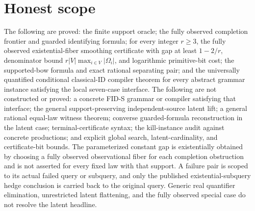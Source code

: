 \documentclass{article}
\begin{document}
\section{Honest scope}

The following are proved: the finite support oracle; the fully observed completion frontier and guarded identifying formula; for every integer \(r\geq3\), the fully observed existential-fiber smoothing certificate with gap at least \(1-2/r\), denominator bound \(r|V|\max_{i\in V}|\Omega_i|\), and logarithmic primitive-bit cost; the supported-bow formula and exact rational separating pair; and the universally quantified conditional classical-ID compiler theorem for every abstract grammar instance satisfying the local seven-case interface. The following are not constructed or proved: a concrete FID-S grammar or compiler satisfying that interface; the general support-preserving independent-source latent lift; a general rational equal-law witness theorem; converse guarded-formula reconstruction in the latent case; terminal-certificate syntax; the kill-instance audit against concrete productions; and explicit global search, latent-cardinality, and certificate-bit bounds. The parameterized constant gap is existentially obtained by choosing a fully observed observational fiber for each completion obstruction and is not asserted for every fixed law with that support. A failure pair is scoped to its actual failed query or subquery, and only the published existential-subquery hedge conclusion is carried back to the original query. Generic real quantifier elimination, unrestricted latent flattening, and the fully observed special case do not resolve the latent headline.
\end{document}
